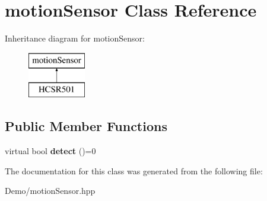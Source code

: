\hypertarget{classmotion_sensor}{}\section{motion\+Sensor Class Reference}
\label{classmotion_sensor}
Inheritance diagram for motion\+Sensor\+:\begin{figure}[H]
\begin{center}
\leavevmode
\includegraphics[height=2.000000cm]{classmotion_sensor}
\end{center}
\end{figure}
\subsection*{Public Member Functions}
\begin{DoxyCompactItemize}
\item 
\mbox{\label{classmotion_sensor_a0b8701a41516d8b1140c39474b1db9db}} 
virtual bool {\bfseries detect} ()=0
\end{DoxyCompactItemize}


The documentation for this class was generated from the following file\+:\begin{DoxyCompactItemize}
\item 
Demo/motion\+Sensor.\+hpp\end{DoxyCompactItemize}
